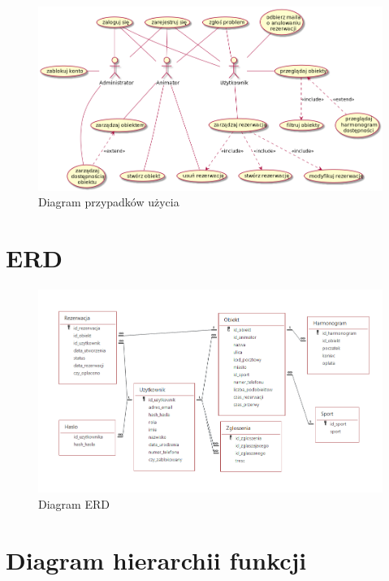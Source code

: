 \documentclass[a4paper,11pt]{article}
\begin{document}
    \begin{figure}[H] 
    	\begin{center}
    	\includegraphics[width=1\textwidth]{img2/usecase.png}
        \caption{Diagram przypadków użycia}
    	\end{center}
    \end{figure}

\section{ERD}

    \begin{figure}[H] 
    	\begin{center}
    	\includegraphics[width=1\textwidth]{img2/erd.png}
        \caption{Diagram ERD}
    	\end{center}
    \end{figure}

\section{Diagram hierarchii funkcji}
\end{document}
